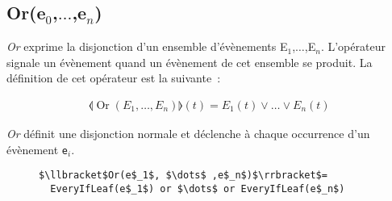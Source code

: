 \subsection*{Or(e$_0$,$\dots$,e$_n$)}
{\em Or} exprime la disjonction d'un ensemble d'évènements {E$_1$,$\dots$,E$_n$}. L'opérateur signale un évènement quand un évènement de cet ensemble se produit. 
La définition de cet opérateur est la suivante~:
\begin{small}
\begin{equation*}
\begin{split}
\llangle\operatorname{Or}(E_1, \dots , E_n)\rrangle(t)=E_1(t)\vee \dots \vee E_n(t)
\end{split}
\end{equation*}
\end{small}

{\em Or} définit une disjonction normale et déclenche à chaque occurrence d'un évènement {\tt e$_i$}. 
\begin{figure}
\begin{lstlisting}[language=EPLPseudoCodeCompile]
$\llbracket$Or(e$_1$, $\dots$ ,e$_n$)$\rrbracket$=
  EveryIfLeaf(e$_1$) or $\dots$ or EveryIfLeaf(e$_n$)
\end{lstlisting}
\end{figure}
